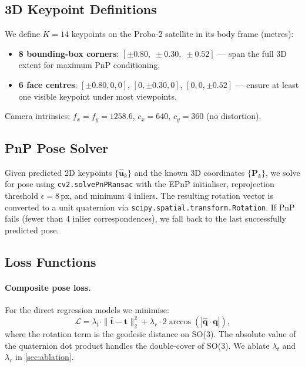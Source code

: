 \documentclass[10pt,twocolumn,letterpaper]{article}
\begin{document}
\subsection{3D Keypoint Definitions}
\label{sec:keypoints}

We define $K=14$ keypoints on the Proba-2 satellite in its body frame
(metres):
\begin{itemize}
  \item \textbf{8 bounding-box corners}: $[\pm0.80,\;\pm0.30,\;\pm0.52]$
        — span the full 3D extent for maximum PnP conditioning.
  \item \textbf{6 face centres}: $[\pm0.80,0,0]$,
        $[0,\pm0.30,0]$, $[0,0,\pm0.52]$
        — ensure at least one visible keypoint under most viewpoints.
\end{itemize}
Camera intrinsics: $f_x = f_y = 1258.6$, $c_x = 640$, $c_y = 360$
(no distortion).

\subsection{PnP Pose Solver}
\label{sec:pnp}

Given predicted 2D keypoints $\{\hat{\mathbf{u}}_k\}$ and the known
3D coordinates $\{\mathbf{P}_k\}$, we solve for pose using
\texttt{cv2.solvePnPRansac} with the EPnP initialiser,
reprojection threshold $\epsilon=8$\,px, and minimum 4 inliers.
The resulting rotation vector is converted to a unit quaternion
via \texttt{scipy.spatial.transform.Rotation}.  If PnP fails
(fewer than 4 inlier correspondences), we fall back to the last
successfully predicted pose.

\subsection{Loss Functions}
\label{sec:loss}

\paragraph{Composite pose loss.}
For the direct regression models we minimise:
\begin{equation}
  \mathcal{L} = \lambda_t \cdot \|\hat{\mathbf{t}} - \mathbf{t}\|_2^2
              + \lambda_r \cdot 2\arccos\!\left(|\hat{\mathbf{q}} \cdot \mathbf{q}|\right),
  \label{eq:loss}
\end{equation}
where the rotation term is the geodesic distance on SO(3).  The
absolute value of the quaternion dot product handles the
double-cover of SO(3).  We ablate $\lambda_t$ and $\lambda_r$
in \cref{sec:ablation}.
\end{document}

